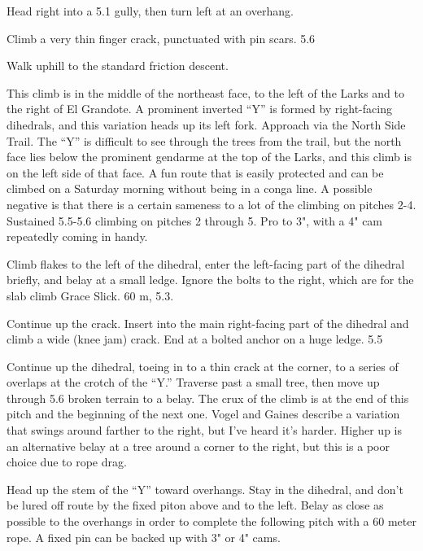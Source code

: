 \documentclass{tahquitz}
\begin{document}
 Head right into a 5.1 gully, then turn left at an overhang.

 Climb a very thin finger crack, punctuated with pin scars. 5.6

Walk uphill to the standard friction descent.




This climb is in the middle of the northeast face, to the left of the
Larks and to the right of El Grandote. A prominent inverted ``Y'' is
formed by right-facing dihedrals, and this variation heads up its
left fork. Approach via the North Side Trail. The ``Y'' is difficult to
see through the trees from the trail, but the north face lies below
the prominent gendarme at the top of the Larks, and this climb is on
the left side of that face. A fun route that is easily protected and
can be climbed on a Saturday morning without being in a conga line. A
possible negative is that there is a certain sameness to a lot of the
climbing on pitches 2-4. Sustained 5.5-5.6 climbing on pitches 2
through 5. Pro to 3", with  a 4" cam repeatedly coming in handy.

 Climb flakes to the left of the dihedral, enter the left-facing
part of the dihedral briefly, and belay at a small ledge. Ignore the
bolts to the right, which are for the slab climb Grace Slick. 60 m,
5.3.

 Continue up the crack. Insert into the main right-facing part of
the dihedral and climb a wide (knee jam) crack. End at a bolted
anchor on a huge ledge. 5.5

 Continue up the dihedral, toeing in to a thin crack at the
corner, to a series of overlaps at the crotch of the ``Y.'' Traverse
past a small tree, then move up through 5.6 broken terrain to a
belay. The crux of the climb is at the end of this pitch and the
beginning of the next one. Vogel and Gaines describe a variation that
swings around farther to the right, but I've heard it's harder.
Higher up is an alternative belay at a tree around a corner to the
right, but this is a poor choice due to rope drag.

 Head up the stem of the ``Y'' toward overhangs. Stay in the
dihedral, and don't be lured off route by the fixed piton above and
to the left. Belay as close as possible to the overhangs in order to
complete the following pitch with a 60 meter rope. A fixed pin can be
backed up with 3" or 4" cams.
\end{document}

